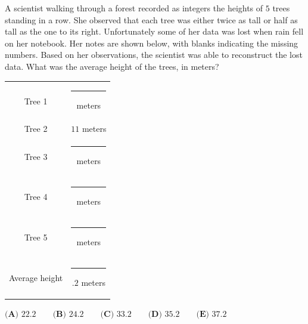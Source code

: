 A scientist walking through a forest recorded as integers the heights of $5$ trees standing in a row. She observed that each tree was either twice as tall or half as tall as the one to its right. Unfortunately some of her data was lost when rain fell on her notebook. Her notes are shown below, with blanks indicating the missing numbers. Based on her observations, the scientist was able to reconstruct the lost data. What was the average height of the trees, in meters?
\begin{center}
\begin{tabular}{|c|c|}
\hline
Tree 1 & \rule{0.6cm}{0.15mm} meters \\
Tree 2 & $11$ meters \\
Tree 3 & \rule{0.6cm}{0.15mm} meters \\
Tree 4 & \rule{0.6cm}{0.15mm} meters \\
Tree 5 & \rule{0.6cm}{0.15mm} meters \\
\hline
Average height & \rule{0.6cm}{0.15mm}$.2$ meters \\
\hline
\end{tabular}
\end{center}
$\textbf{(A) }22.2 \qquad \textbf{(B) }24.2 \qquad \textbf{(C) }33.2 \qquad \textbf{(D) }35.2 \qquad \textbf{(E) }37.2$
